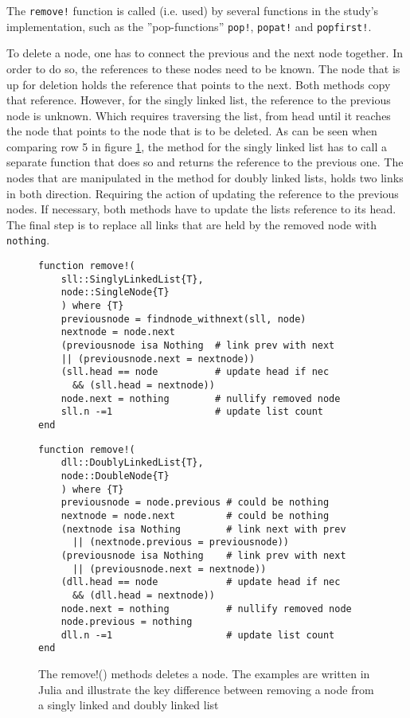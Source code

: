 \documentclass[a4paper, 11pt]{article}
\begin{document}
    The \texttt{remove!} function is called (i.e. used) by several
    functions in the study's implementation, 
    such as the ''pop-functions'' \texttt{pop!}, \texttt{popat!} and
    \texttt{popfirst!}.
    
    To delete a node, one has to connect the previous and the next node together. 
    In order to do so, the references to these nodes need to be known. 
    The node that is up for deletion holds the reference that points to the next. 
    Both methods copy that reference. 
    However, for the singly linked list, the reference to the previous node is unknown.
    Which requires traversing the list, from head until it reaches
    the node that points to the node that is to be deleted. As can be seen when
    comparing row 5 in figure \ref{code:remove!}, the method for the
    singly linked list has to call a separate function that does so 
    and returns the reference to the previous one. 
    The nodes that are manipulated in the method for doubly linked lists, 
    holds two links in both direction. Requiring the action of updating 
    the reference to the previous nodes. 
    If necessary, both methods have to update the 
    lists reference to its head.
    The final step is to replace all links that are held by the removed node
    with \texttt{nothing}.
    \begin{figure}[H]
    \centering
    \begin{verbatim}
function remove!(
    sll::SinglyLinkedList{T}, 
    node::SingleNode{T}
    ) where {T}
    previousnode = findnode_withnext(sll, node)
    nextnode = node.next
    (previousnode isa Nothing  # link prev with next
    || (previousnode.next = nextnode))
    (sll.head == node          # update head if nec
      && (sll.head = nextnode))
    node.next = nothing        # nullify removed node
    sll.n -=1                  # update list count
end
    \end{verbatim}
    \begin{verbatim}
function remove!(
    dll::DoublyLinkedList{T}, 
    node::DoubleNode{T}
    ) where {T}
    previousnode = node.previous # could be nothing
    nextnode = node.next         # could be nothing
    (nextnode isa Nothing        # link next with prev
      || (nextnode.previous = previousnode))
    (previousnode isa Nothing    # link prev with next
      || (previousnode.next = nextnode))
    (dll.head == node            # update head if nec
      && (dll.head = nextnode))
    node.next = nothing          # nullify removed node
    node.previous = nothing
    dll.n -=1                    # update list count
end
    \end{verbatim}
    \caption{The remove!() methods deletes a node. 
    The examples are written in Julia and illustrate the 
    key difference between removing a node from a 
    singly linked and doubly linked list}
    \label{code:remove!}
    \end{figure}
    
\end{document}
